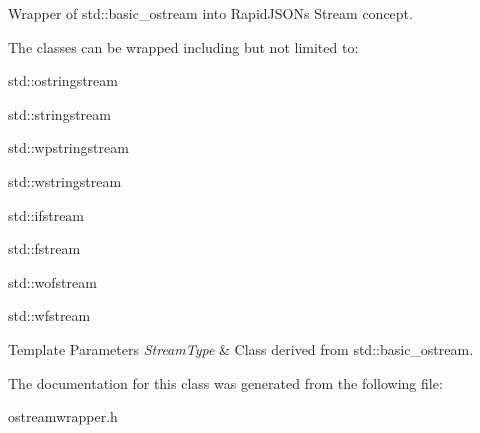 Wrapper of {\ttfamily std\+::basic\+\_\+ostream} into Rapid\+J\+S\+ON\textquotesingle{}s Stream concept. 

The classes can be wrapped including but not limited to\+:


\begin{DoxyItemize}
\item {\ttfamily std\+::ostringstream} 
\item {\ttfamily std\+::stringstream} 
\item {\ttfamily std\+::wpstringstream} 
\item {\ttfamily std\+::wstringstream} 
\item {\ttfamily std\+::ifstream} 
\item {\ttfamily std\+::fstream} 
\item {\ttfamily std\+::wofstream} 
\item {\ttfamily std\+::wfstream} 
\end{DoxyItemize}


\begin{DoxyTemplParams}{Template Parameters}
{\em Stream\+Type} & Class derived from {\ttfamily std\+::basic\+\_\+ostream}. \\
\hline
\end{DoxyTemplParams}


The documentation for this class was generated from the following file\+:\begin{DoxyCompactItemize}
\item 
ostreamwrapper.\+h\end{DoxyCompactItemize}
